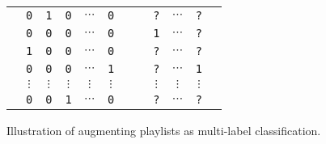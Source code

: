 \begin{figure}[!h]
\centering
\setlength{\tabcolsep}{1pt} %
\begin{tabular}{|*{7}{c}|ccccc|} \hline
\rule{0em}{10pt}
& \texttt{0} & \texttt{1} & \texttt{0} & $\cdots$ & \texttt{0} & & & \texttt{?} & $\cdots$ & \texttt{?} & \\
& \texttt{0} & \texttt{0} & \texttt{0} & $\cdots$ & \texttt{0} & & & \texttt{1} & $\cdots$ & \texttt{?} & \\
& \texttt{1} & \texttt{0} & \texttt{0} & $\cdots$ & \texttt{0} & & & \texttt{?} & $\cdots$ & \texttt{?} & \\
\vspace{-5pt}
& \texttt{0} & \texttt{0} & \texttt{0} & $\cdots$ & \texttt{1} & & & \texttt{?} & $\cdots$ & \texttt{1} & \\
& $\vdots$ & $\vdots$ & $\vdots$ & $\vdots$ & $\vdots$ & & & $\vdots$ & $\vdots$ & $\vdots$ & \\
& \texttt{0} & \texttt{0} & \texttt{1} & $\cdots$ & \texttt{0} & & & \texttt{?} & $\cdots$ & \texttt{?} & \\ \hline
\end{tabular}
\caption{Illustration of augmenting playlists as multi-label classification.}
\label{fig:pla}
\end{figure}
